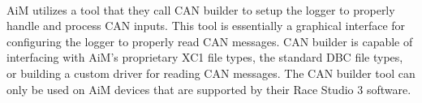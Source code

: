 \paragraph{}
AiM utilizes a tool that they call CAN builder to setup the logger to properly handle and process CAN inputs.
This tool is essentially a graphical interface for configuring the logger to properly read CAN messages.
CAN builder is capable of interfacing with AiM's proprietary XC1 file types, the standard DBC file types, or building a custom driver for reading CAN messages.
The CAN builder tool can only be used on AiM devices that are supported by their Race Studio 3 software.